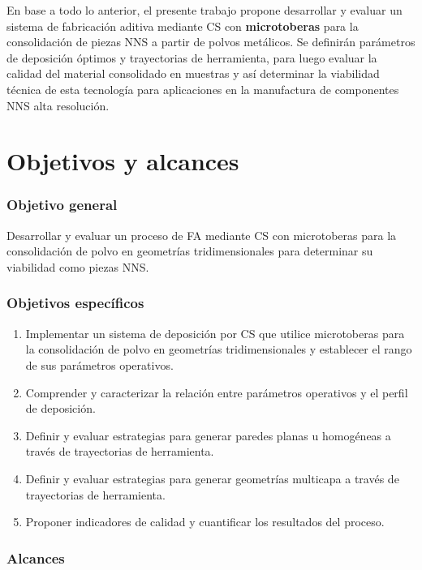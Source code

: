 En base a todo lo anterior, el presente trabajo propone desarrollar y evaluar un sistema de fabricación aditiva mediante CS con \textbf{microtoberas} para la consolidación de piezas NNS a partir de polvos metálicos. Se definirán parámetros de deposición óptimos y trayectorias de herramienta, para luego evaluar la calidad del material consolidado en muestras y así determinar la viabilidad técnica de esta tecnología para aplicaciones en la manufactura de componentes NNS alta resolución.


\section{Objetivos y alcances}

\subsubsection{Objetivo general}

Desarrollar y evaluar un proceso de FA mediante CS con microtoberas para la consolidación de polvo en geometrías tridimensionales para determinar su viabilidad como piezas NNS.

\subsubsection{Objetivos específicos}

\begin{enumerate}
	
	\item Implementar un sistema de deposición por CS que utilice microtoberas para la consolidación de polvo en geometrías tridimensionales y establecer el rango de sus parámetros operativos.
	\item Comprender y caracterizar la relación entre parámetros operativos y el perfil de deposición.
	\item Definir y evaluar estrategias para generar paredes planas u homogéneas a través de trayectorias de herramienta.
	\item  Definir y evaluar estrategias para generar geometrías multicapa a través de trayectorias de herramienta.
	\item Proponer indicadores de calidad y cuantificar los resultados del proceso.

\end{enumerate}

\subsubsection{Alcances}

